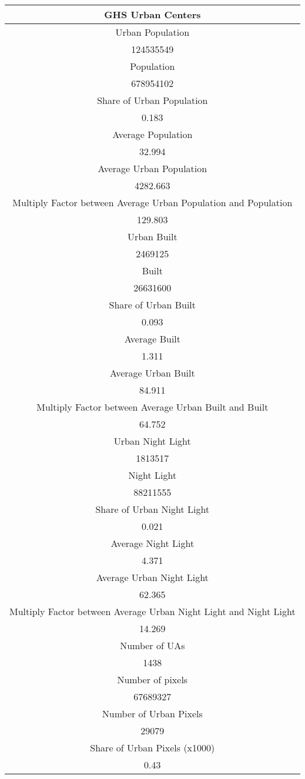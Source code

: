 \documentclass{article}%
\begin{document}
%
\normalsize%
\begin{tabular}{c}%
\hline%
GHS Urban Centers\\%
\hline%
Urban Population\\%
124535549\\%
Population\\%
678954102\\%
Share of Urban Population\\%
0.183\\%
Average Population\\%
32.994\\%
Average Urban Population\\%
4282.663\\%
Multiply Factor between Average Urban Population and Population\\%
129.803\\%
\hline%
Urban Built\\%
2469125\\%
Built\\%
26631600\\%
Share of Urban Built\\%
0.093\\%
Average Built\\%
1.311\\%
Average Urban Built\\%
84.911\\%
Multiply Factor between Average Urban Built and Built\\%
64.752\\%
\hline%
Urban Night Light\\%
1813517\\%
Night Light\\%
88211555\\%
Share of Urban Night Light\\%
0.021\\%
Average Night Light\\%
4.371\\%
Average Urban Night Light\\%
62.365\\%
Multiply Factor between Average Urban Night Light and Night Light\\%
14.269\\%
\hline%
Number of UAs\\%
1438\\%
Number of pixels\\%
67689327\\%
Number of Urban Pixels\\%
29079\\%
Share of Urban Pixels (x1000)\\%
0.43\\%
\hline%
\hline%
\end{tabular}%
\end{document}
